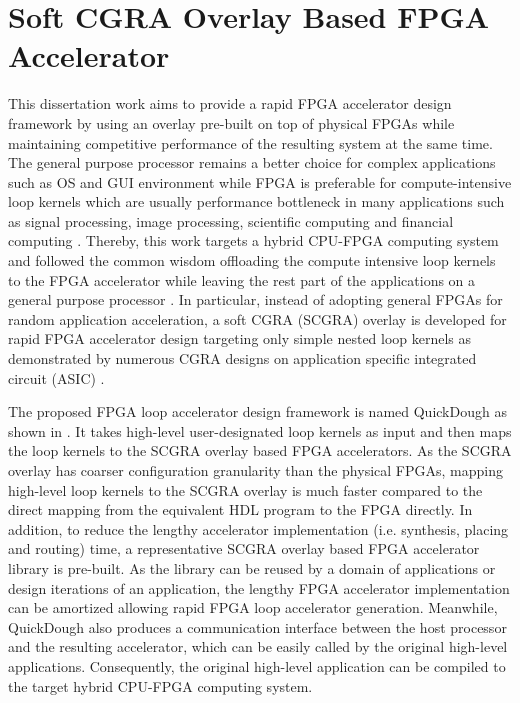 \section{Soft CGRA Overlay Based FPGA Accelerator}
This dissertation work aims to provide a rapid FPGA accelerator design framework by using an overlay pre-built on top of physical FPGAs while maintaining competitive performance of the resulting system at the same time. The general purpose processor remains a better choice for complex applications such as OS and GUI environment while FPGA is preferable for compute-intensive loop kernels which are usually performance bottleneck in many applications such as signal processing, image processing, scientific computing and financial computing \cite{sukhsawas2004high, bouris2010fast, wu2009fine, tian2008high}. Thereby, this work targets a hybrid CPU-FPGA computing system and followed the common wisdom offloading the compute intensive loop kernels to the FPGA accelerator while leaving the rest part of the applications on a general purpose processor \cite{baleani2002HW-SW, canis2011legup}. In particular, instead of adopting general FPGAs for random application acceleration, a soft CGRA (SCGRA) overlay is developed for rapid FPGA accelerator design targeting only simple nested loop kernels as demonstrated by numerous CGRA designs on application specific integrated circuit (ASIC) \cite{compton2002reconfigurable, tessier2001reconfigurable}.  

The proposed FPGA loop accelerator design framework is named QuickDough as shown in . It takes high-level user-designated loop kernels as input and then maps the loop kernels to the SCGRA overlay based FPGA accelerators. As the SCGRA overlay has coarser configuration granularity than the physical FPGAs, mapping high-level loop kernels to the SCGRA overlay is much faster compared to the direct mapping from the equivalent HDL program to the FPGA directly. In addition, to reduce the lengthy accelerator implementation (i.e. synthesis, placing and routing) time, a representative SCGRA overlay based FPGA accelerator library is pre-built. As the library can be reused by a domain of applications or design iterations of an application, the lengthy FPGA accelerator implementation can be amortized allowing rapid FPGA loop accelerator generation. Meanwhile, QuickDough also produces a communication interface between the host processor and the resulting accelerator, which can be easily called by the original high-level applications. Consequently, the original high-level application can be compiled to the target hybrid CPU-FPGA computing system.


